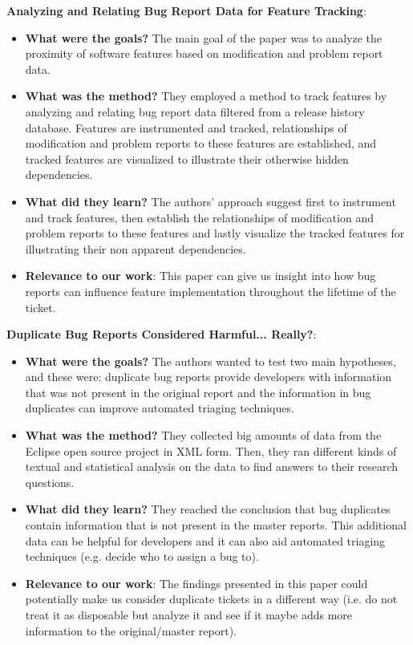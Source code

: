 \documentclass{mprop}
\begin{document}
\textbf{Analyzing and Relating Bug Report Data for Feature Tracking}\cite{fischer2003analyzing}:
\begin{itemize}
  \item \textbf{What were the goals?}
  The main goal of the paper was to analyze the proximity of software features based on modification and problem report data.
  \item \textbf{What was the method?}
  They employed a method to track features by analyzing and relating bug report data filtered from a release history database. Features are instrumented and tracked, relationships of modification and problem reports to these features are established, and tracked features are visualized to illustrate their otherwise hidden dependencies. 
  \item \textbf{What did they learn?}
  The authors’ approach suggest first to instrument and track features, then establish the relationships of modification and problem reports to these features and lastly visualize the tracked features for illustrating their non apparent dependencies. 
  \item \textbf{Relevance to our work}:
  This paper can give us insight into how bug reports can influence feature implementation throughout the lifetime of the ticket. 
\end{itemize}

\textbf{Duplicate Bug Reports Considered Harmful... Really?}\cite{bettenburg2008duplicate}:
\begin{itemize}
  \item \textbf{What were the goals?}
  The authors wanted to test two main hypotheses, and these were: duplicate bug reports provide developers with information that was not present in the original report and the information in bug duplicates can improve automated triaging techniques. 
  \item \textbf{What was the method?}
  They collected big amounts of data from the Eclipse open source project in XML form. Then, they ran different kinds of textual and statistical analysis on the data to find answers to their research questions. 
  \item \textbf{What did they learn?}
  They reached the conclusion that bug duplicates contain information that is not present in the master reports. This additional data can be helpful for developers and it can also aid automated triaging techniques (e.g. decide who to assign a bug to). 
  \item \textbf{Relevance to our work}:
  The findings presented in this paper could potentially make us consider duplicate tickets in a different way (i.e. do not treat it as disposable but analyze it and see if it maybe adds more information to the original/master report). 
\end{itemize}
\end{document}
